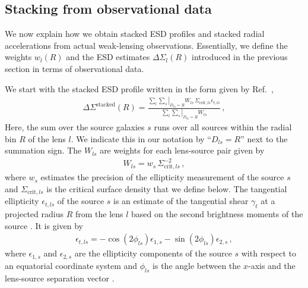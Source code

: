 \documentclass[a4paper,11pt]{article}
\begin{document}
\subsection{Stacking from observational data}
\label{sec:appendix:newmethod:observational}

We now explain how we obtain stacked ESD profiles and stacked radial accelerations from actual weak-lensing observations.
Essentially, we define the weights $w_l(R)$ and the ESD estimates $\Delta \Sigma_l(R)$ introduced in the previous section in terms of observational data.

We start with the stacked ESD profile written in the form given by Ref.~\cite{Brouwer2021},
\begin{align}
\label{eq:esd_stacked_Brouwer}
\Delta \Sigma^{\mathrm{stacked}}(R) = \frac{
  \sum_l \left. \sum_s\right|_{D_{ls} = R} W_{ls} \, \Sigma_{\mathrm{crit},ls} \epsilon_{t,ls}
}{
  \sum_l \left.\sum_s\right|_{D_{ls} = R} W_{ls}
} \,,
\end{align}
Here, the sum over the source galaxies $s$ runs over all sources within the radial bin $R$ of the lens $l$.
We indicate this in our notation by ``$D_{ls} = R$'' next to the summation sign.
The $W_{ls}$ are weights for each lens-source pair given by
\begin{align}
 W_{ls} = w_s \, \Sigma_{\mathrm{crit},ls}^{-2}  \,,
\end{align}
where $w_s$ estimates the precision of the ellipticity measurement of the source $s$ and $\Sigma_{\mathrm{crit},ls}$ is the critical surface density that we define below.
The tangential ellipticity $\epsilon_{t,ls}$ of the source $s$ is an estimate of the tangential shear $\gamma_t$ at a projected radius $R$ from the lens $l$ based on the second brightness moments of the source \citep{Bartelmann2001}.
It is given by
\begin{align}
\epsilon_{t,ls} = - \cos(2\phi_{ls}) \epsilon_{1,s} - \sin(2 \phi_{ls}) \epsilon_{2,s} \,,
\end{align}
where $\epsilon_{1,s}$ and $\epsilon_{2,s}$ are the ellipticity components of the source $s$ with respect to an equatorial coordinate system and $\phi_{ls}$ is the angle between the $x$-axis and the lens-source separation vector \citep{Dvornik2017,Bartelmann2001}.
\end{document}
